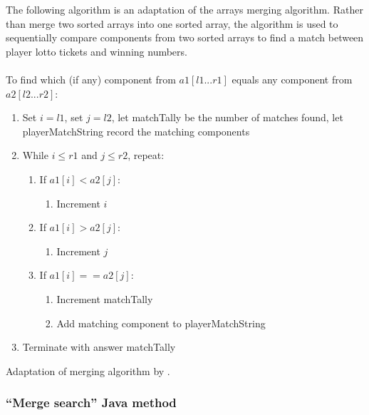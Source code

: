 The following algorithm is an adaptation of the arrays merging algorithm. Rather than merge two sorted arrays into one sorted array, the algorithm is used to sequentially compare components from two sorted arrays to find a match between player lotto tickets and winning numbers.
\\
\\
To find which (if any) component from $a1[l1...r1]$ equals any component from $a2[l2...r2]$:

\begin{enumerate}
\item Set $i = l1$, set $j = l2$, let matchTally be the number of matches found, let playerMatchString record the matching components
\item While $i \leq r1$ and $j \leq r2$, repeat:
	\begin{enumerate}
	\item If $a1[i] < a2[j]$:
		\begin{enumerate}
		\item Increment $i$
		\end{enumerate}
	\item If $a1[i] > a2[j]$:
		\begin{enumerate}
		\item Increment $j$
		\end{enumerate}
	\item If $a1[i] ==  a2[j]$:
		\begin{enumerate}
		\item Increment matchTally
		\item Add matching component to playerMatchString
		\end{enumerate}
	\end{enumerate}
\item Terminate with answer matchTally
\end{enumerate}

\noindent
Adaptation of merging algorithm by \citet[p. 46]{Watt2001}.

\subsubsection{``Merge search'' Java method}

